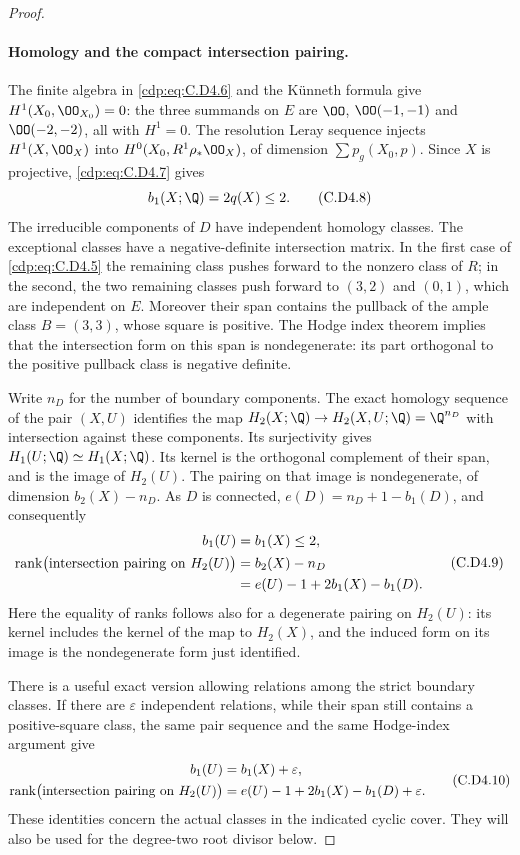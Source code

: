 \begin{proof}
\paragraph{Homology and the compact intersection pairing.}
The finite algebra in \eqref{cdp:eq:C.D4.6} and the K\"unneth formula give
$H^1(X_0,\OO_{X_0})=0$: the three summands on $E$ are
$\OO$, $\OO(-1,-1)$ and $\OO(-2,-2)$, all with $H^1=0$.
The resolution Leray sequence injects $H^1(X,\OO_X)$ into
$H^0(X_0,R^1\rho_*\OO_X)$, of dimension
$\sum p_g(X_0,p)$. Since $X$ is projective, \eqref{cdp:eq:C.D4.7} gives
\[
                         b_1(X;\Q)=2q(X)\le2.
\tag{C.D4.8}\label{cdp:eq:C.D4.8}
\]
The irreducible components of $D$ have independent homology
classes. The exceptional classes have a negative-definite
intersection matrix. In the first case of \eqref{cdp:eq:C.D4.5} the
remaining class pushes forward to the nonzero class of $R$;
in the second, the two remaining classes push forward to
$(3,2)$ and $(0,1)$, which are independent on $E$.
Moreover their span contains the pullback of the ample
class $B=(3,3)$, whose square is positive. The Hodge index
theorem implies that the intersection form on this span is
nondegenerate: its part orthogonal to the positive pullback
class is negative definite.

Write $n_D$ for the number of boundary components. The exact
homology sequence of the pair $(X,U)$ identifies the map
$H_2(X;\Q)\to H_2(X,U;\Q)=\Q^{n_D}$ with intersection
against these components. Its surjectivity gives
$H_1(U;\Q)\simeq H_1(X;\Q)$. Its kernel is the orthogonal
complement of their span, and is the image of $H_2(U)$.
The pairing on that image is nondegenerate, of dimension
$b_2(X)-n_D$. As $D$ is connected,
$e(D)=n_D+1-b_1(D)$, and consequently
\[
\begin{split}
 b_1(U)&=b_1(X)\le2,\\
 \operatorname{rank}\bigl(\hbox{intersection pairing on }H_2(U)\bigr)
     &=b_2(X)-n_D\\
     &=e(U)-1+2b_1(X)-b_1(D).
\end{split}
\tag{C.D4.9}\label{cdp:eq:C.D4.9}
\]
Here the equality of ranks follows also for a degenerate
pairing on $H_2(U)$: its kernel includes the kernel of the
map to $H_2(X)$, and the induced form on its image is the
nondegenerate form just identified.

There is a useful exact version allowing relations among
the strict boundary classes. If there are $\varepsilon$
independent relations, while their span still contains a
positive-square class, the same pair sequence and the same
Hodge-index argument give
\[
\begin{split}
 b_1(U)&=b_1(X)+\varepsilon,\\
 \operatorname{rank}\bigl(\hbox{intersection pairing on }H_2(U)\bigr)
 &=e(U)-1+2b_1(X)-b_1(D)+\varepsilon.
\end{split}
\tag{C.D4.10}\label{cdp:eq:C.D4.10}
\]
These identities concern the actual classes in the indicated
cyclic cover. They will also be used for the degree-two
root divisor below.


\end{proof}
